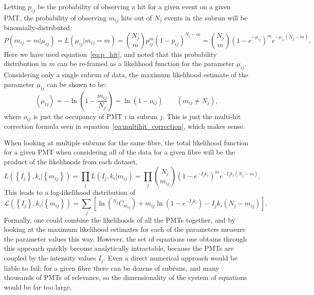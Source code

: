 Letting $p_{ij}$ be the probability of observing a hit for a given event on a given PMT, the probability of observing $m_{ij}$ hits out of $N_{j}$ events in the subrun will be binomially-distributed:
\begin{equation}
    P(m_{ij} = m | \mu_{ij}) = L(\mu_{ij} | m_{ij} = m) = \binom{N_{j}}{m}p_{ij}^{m}(1-p_{ij})^{N_{j}-m} = \binom{N_{j}}{m}\left(1-e^{-\mu_{ij}}\right)^{m}e^{-\mu_{ij}(N_{j}-m)}.
\end{equation}
Here we have used equation~\ref{eq:p_hit}, and noted that this probability distribution in $m$ can be re-framed as a likelihood function for the parameter $\mu_{ij}$. Considering only a single subrun of data, the maximum likelihood estimate of the parameter $\mu_{ij}$ can be shown to be:
\begin{equation}
    \left<\mu_{ij}\right> = -\ln\left(1-\frac{m_{ij}}{N_{j}}\right) = \ln\left(1-o_{ij}\right) \qquad(m_{ij} \neq N_{j}),
\end{equation}
where $o_{ij}$ is just the occupancy of PMT $i$ in subrun $j$. This is just the multi-hit correction formula seen in equation~\ref{eq:multihit_correction}, which makes sense.

When looking at multiple subruns for the same fibre, the total likelihood function for a given PMT when considering all of the data for a given fibre will be the product of the likelihoods from each dataset,
\begin{equation}
    L\left(\left\{I_{j}\right\}, k_{i} | \left\{m_{ij}\right\}\right) = \prod_{j} L(I_{j}, k_{i} | m_{ij}) = \prod_{j}\binom{N_{j}}{m_{ij}}\left(1-e^{-I_{j}k_{i}}\right)^{m}e^{-I_{j}k_{i}(N_{j}-m)}.
\end{equation}
This leads to a log-likelihood distribution of
\begin{equation}
    \mathcal{L}\left(\left\{I_{j}\right\}, k_{i} | \left\{m_{ij}\right\}\right) = \sum_{j}\left[\ln\left(^{N_{j}}C_{m_{ij}}\right) + m_{ij}\ln\left(1 - e^{-I_{j}k_{i}}\right) - I_{j}k_{i}\left(N_{j} - m_{ij}\right)\right].
\end{equation}
Formally, one could combine the likelihoods of all the PMTs together, and by looking at the maximum likelihood estimates for each of the parameters measure the parameter values this way. However, the set of equations one obtains through this approach quickly become analytically intractable, because the PMTs are coupled by the intensity values $I_{j}$. Even a direct numerical approach would be liable to fail: for a given fibre there can be dozens of subruns, and many thousands of PMTs of relevance, so the dimensionality of the system of equations would be far too large.

